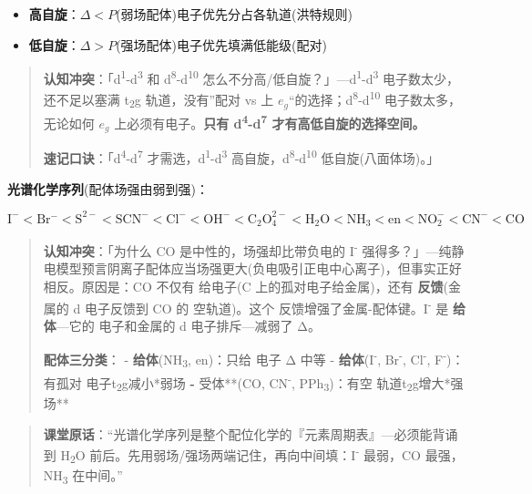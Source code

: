 \begin{itemize}
\tightlist
\item
  \textbf{高自旋}：\(\Delta < P\)(弱场配体)\箭 电子优先分占各轨道(洪特规则)
\item
  \textbf{低自旋}：\(\Delta > P\)(强场配体)\箭 电子优先填满低能级(配对)
\end{itemize}

\begin{quote}
\textbf{认知冲突}：「d\textsuperscript{1}-d\textsuperscript{3} 和 d\textsuperscript{8}-d\textsuperscript{10} 怎么不分高/低自旋？」---d\textsuperscript{1}-d\textsuperscript{3} 电子数太少，还不足以塞满 t\textsubscript{2}g 轨道，没有''配对 vs 上 \(e_g\)``的选择；d\textsuperscript{8}-d\textsuperscript{10} 电子数太多，无论如何 \(e_g\) 上必须有电子。\textbf{只有 d\textsuperscript{4}-d\textsuperscript{7} 才有高低自旋的选择空间。}

\textbf{速记口诀}：「d\textsuperscript{4}-d\textsuperscript{7} 才需选，d\textsuperscript{1}-d\textsuperscript{3} 高自旋，d\textsuperscript{8}-d\textsuperscript{10} 低自旋(八面体场)。」
\end{quote}

\textbf{光谱化学序列}(配体场强由弱到强)：

\[
\mathrm{I^- < Br^- < S^{2-} < SCN^- < Cl^- < OH^- < C_2O_4^{2-} < H_2O < NH_3 < en < NO_2^- < CN^- < CO}
\]

\begin{quote}
\textbf{认知冲突}：「为什么 CO 是中性的，场强却比带负电的 I\textsuperscript{-} 强得多？」---纯静电模型预言阴离子配体应当场强更大(负电吸引正电中心离子)，但事实正好相反。原因是：CO 不仅有  给电子(C 上的孤对电子给金属)，还有 \textbf{\派 反馈}(金属的 d 电子反馈到 CO 的 \派* 空轨道)。这个 \派 反馈增强了金属-配体键。I\textsuperscript{-} 是 \textbf{\派 给体}---它的 \派 电子和金属的 d 电子排斥---减弱了 Δ。

\textbf{配体三分类}：
- \textbf{ 给体}(NH\textsubscript{3}, en)：只给  电子 \箭 Δ 中等
- \textbf{\派 给体}(I\textsuperscript{-}, Br\textsuperscript{-}, Cl\textsuperscript{-}, F\textsuperscript{-})：有孤对 \派 电子 t\textsubscript{2}g 减小\箭**弱场\textbf{
- }\派 受体**(CO, CN\textsuperscript{-}, PPh\textsubscript{3})：有空 \派* 轨道 t\textsubscript{2}g 增大\箭**强场**
\end{quote}

\begin{quote}
\textbf{课堂原话}：``光谱化学序列是整个配位化学的『元素周期表』---必须能背诵到 H\textsubscript{2}O 前后。先用弱场/强场两端记住，再向中间填：I\textsuperscript{-} 最弱，CO 最强，NH\textsubscript{3} 在中间。''
\end{quote}

